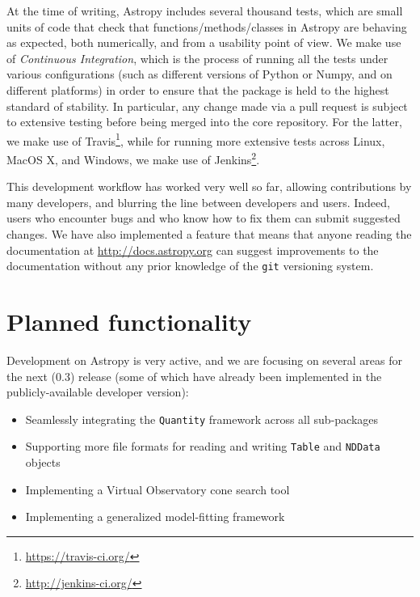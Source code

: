 \documentclass[traditabstract]{aa}
\begin{document}
At the time of writing, Astropy includes several thousand tests, which are
small units of code that check that functions/methods/classes in Astropy are
behaving as expected, both numerically, and from a usability point of view. We
make use of \textit{Continuous Integration}, which is the process of running
all the tests under various configurations (such as different versions of
Python or Numpy, and on different platforms) in order to ensure that the
package is held to the highest standard of stability. In particular, any
change made via a pull request is subject to extensive testing before being
merged into the core repository. For the latter, we make use of
Travis\footnote{\url{https://travis-ci.org/}}, while for running more
extensive tests across Linux, MacOS X, and Windows, we make use of
Jenkins\footnote{\url{http://jenkins-ci.org/}}.

This development workflow has worked very well so far, allowing contributions
by many developers, and blurring the line between developers and users.
Indeed, users who encounter bugs and who know how to fix them can submit
suggested changes. We have also implemented a feature that means that anyone
reading the documentation at \url{http://docs.astropy.org} can suggest
improvements to the documentation without any prior knowledge of the
\texttt{git} versioning system.

\section{Planned functionality}

\label{sec:future}


Development on Astropy is very active, and we are focusing on several areas
for the next (0.3) release (some of which have already been implemented in the
publicly-available developer version):

\begin{itemize}
\item Seamlessly integrating the \texttt{Quantity} framework across all sub-packages
\item Supporting more file formats for reading and writing \texttt{Table} and \texttt{NDData} objects
\item Implementing a Virtual Observatory cone search tool
\item Implementing a generalized model-fitting framework
\end{itemize}
\end{document}
